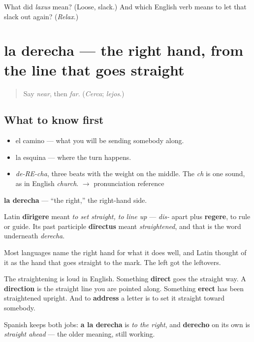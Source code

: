 \begin{tcolorbox}[breakable,colback=teal!4,colframe=teal!35!black,title={Before you move on}]
What did \emph{laxus} mean? (Loose, slack.) And which English verb means to let that slack out again? (\emph{Relax}.)
\end{tcolorbox}
\section[la derecha]{la derecha — the right hand, from the line that goes straight}

\label{lesson:ES-C340-derecha}



\begin{quote}
Say \emph{near}, then \emph{far}. (\emph{Cerca}; \emph{lejos}.)
\end{quote}

\subsection*{What to know first}
\begin{itemize}
\raggedright
  \item el camino — what you will be sending somebody along.
  \item la esquina — where the turn happens.
\end{itemize}

\begin{sounds}
\begin{itemize}
\raggedright
  \item \emph{de-RE-cha}, three beats with the weight on the middle. The \emph{ch} is one sound, as in English \emph{church}. $\to$ pronunciation reference
\end{itemize}
\end{sounds}

\begin{cousinweb}
\textbf{la derecha} — \textquotedblleft{}the right,\textquotedblright{} the right-hand side.

Latin \textbf{dīrigere} meant \emph{to set straight, to line up} — \emph{dis-} apart plus \textbf{regere}, to rule or guide. Its past participle \textbf{dīrectus} meant \emph{straightened}, and that is the word underneath \emph{derecha}.

Most languages name the right hand for what it does well, and Latin thought of it as the hand that goes straight to the mark. The left got the leftovers.

The straightening is loud in English. Something \textbf{direct} goes the straight way. A \textbf{direction} is the straight line you are pointed along. Something \textbf{erect} has been straightened upright. And to \textbf{address} a letter is to set it straight toward somebody.

Spanish keeps both jobs: \textbf{a la derecha} is \emph{to the right}, and \textbf{derecho} on its own is \emph{straight ahead} — the older meaning, still working.
\end{cousinweb}

